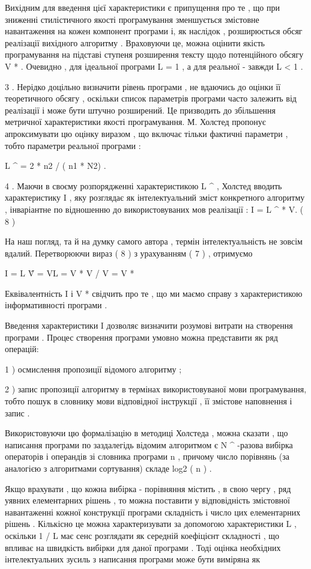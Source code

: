 \begin{description}
Вихідним для введення цієї характеристики є припущення про те , що при зниженні стилістичного якості програмування зменшується змістовне навантаження на кожен компонент програми і, як наслідок , розширюється обсяг реалізації вихідного алгоритму . Враховуючи це, можна оцінити якість програмування на підставі ступеня розширення тексту щодо потенційного обсягу V * . Очевидно , для ідеальної програми L = 1 , а для реальної - завжди L \textless{} 1 .

3 . Нерідко доцільно визначити рівень програми , не вдаючись до оцінки її теоретичного обсягу , оскільки список параметрів програми часто залежить від реалізації і може бути штучно розширений. Це призводить до збільшення метричної характеристики якості програмування. М. Холстед пропонує апроксимувати цю оцінку виразом , що включає тільки фактичні параметри , тобто параметри реальної програми :

L \textasciicircum{} = 2 * n2 / ( n1 * N2) .

4 . Маючи в своєму розпорядженні характеристикою L \textasciicircum{} , Холстед вводить характеристику I , яку розглядає як інтелектуальний зміст конкретного алгоритму , інваріантне по відношенню до використовуваних мов реалізації : I = L \textasciicircum{} * V. ( 8 )

На наш погляд, та й на думку самого автора , термін інтелектуальність не зовсім вдалий. Перетворюючи вираз ( 8 ) з урахуванням ( 7 ) , отримуємо

I = L \^ V = VL = V * V / V = V *

Еквівалентність I і V * свідчить про те , що ми маємо справу з характеристикою інформативності програми .

Введення характеристики I дозволяє визначити розумові витрати на створення програми . Процес створення програми умовно можна представити як ряд операцій:

1 ) осмислення пропозиції відомого алгоритму ;

2 ) запис пропозиції алгоритму в термінах використовуваної мови програмування, тобто пошук в словнику мови відповідної інструкції , її змістове наповнення і запис .

Використовуючи цю формалізацію в методиці Холстеда , можна сказати , що написання програми по заздалегідь відомим алгоритмом є N \textasciicircum{} -разова вибірка операторів і операндів зі словника програми n , причому число порівнянь (за аналогією з алгоритмами сортування) складе log2 ( n ) .

Якщо врахувати , що кожна вибірка - порівняння містить , в свою чергу , ряд уявних елементарних рішень , то можна поставити у відповідність змістовної навантаженні кожної конструкції програми складність і число цих елементарних рішень . Кількісно це можна характеризувати за допомогою характеристики L , оскільки 1 / L має сенс розглядати як середній коефіцієнт складності , що впливає на швидкість вибірки для даної програми . Тоді оцінка необхідних інтелектуальних зусиль з написання програми може бути виміряна як


\end{description}
